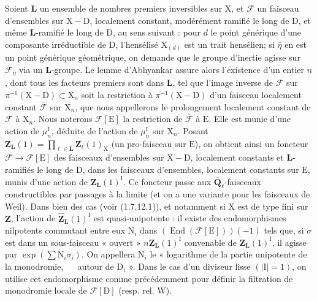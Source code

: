 \documentclass[11pt,leqno]{article}
\newcommand{\Page}[1]{\ifvmode\noindent\else\unskip\ \fi{\footnotesize\textcolor{gray}{[p.\,#1]}}\ \ignorespaces}
\begin{document}
Soient \(\mathbf{L}\) un ensemble de nombres premiers inversibles sur \(\mathrm{X}\), et \(\mathscr{F}\) un faisceau d’ensembles sur \(\mathrm{X}-\mathrm{D}\), localement constant, modérément ramifié le long de \(\mathrm{D}\), et même \(\mathbf{L}\)-ramifié le long de \(\mathrm{D}\), au sens suivant : pour \(d\) le point générique d’une composante irréductible de \(\mathrm{D}\), l’hensélisé \(\mathrm{X}_{(d)}\) est un trait hensélien; si \(\bar{\eta}\) en est un point générique géométrique, on demande que le groupe d’inertie agisse sur \(\mathscr{F}_{\bar{\eta}}\) via un \(\mathbf{L}\)-groupe. Le lemme d’Abhyankar assure alors l’existence d’un entier \(n\), dont tous les facteurs premiers sont dans \(\mathbf{L}\), tel que l’image inverse de \(\mathscr{F}\) sur \(\pi^{-1}(\mathrm{X}-\mathrm{D})\subset\mathrm{X}_n\) soit la restriction à \(\pi^{-1}(\mathrm{X}-\mathrm{D})\) d’un faisceau localement constant \(\overline{\mathscr{F}}\) sur \(\mathrm{X}_n\), que nous appellerons le prolongement localement constant de \(\mathscr{F}\) à \(\mathrm{X}_n\). Nous noterons \(\mathscr{F}[\mathrm{E}]\) la restriction de \(\overline{\mathscr{F}}\) à \(\mathrm{E}\). Elle est munie d’une action de \(\mu_n^{\mathrm{I}}\), déduite de l’action de \(\mu_n^{\mathrm{I}}\) sur \(\mathrm{X}_n\). Posant \(\mathbf{Z}_{\mathbf{L}}(1)=\prod\limits_{\ell\in\mathbf{L}}\mathbf{Z}_\ell(1)_{\mathrm{X}}\) (un pro-faisceau sur \(\mathrm{E}\)), on obtient ainsi un foncteur \(\mathscr{F}\to\mathscr{F}[\mathrm{E}]\) des faisceaux d’ensembles sur \(\mathrm{X}-\mathrm{D}\), localement constants et \(\mathbf{L}\)-ramifiés le long de \(\mathrm{D}\), dans les faisceaux d’ensembles, localement constants sur \(\mathrm{E}\), munis d’une action de \(\mathbf{Z}_{\mathbf{L}}(1)^{\mathrm{I}}\).
Ce foncteur passe aux \(\overline{\mathbf{Q}}_\ell\)-faisceaux constructibles par passages à la limite (et on a une variante pour les faisceaux de Weil). Dans bien des cas (voir (1.7.12.1)), et notamment si \(\mathrm{X}\) est de type fini sur \(\mathbf{Z}\), l’action de \(\widehat{\mathbf{Z}}_{\mathbf{L}}(1)^{\mathrm{I}}\) est quasi-unipotente : il existe des endomorphismes nilpotents commutant entre eux \(\mathrm{N}_i\) dans \((\operatorname{End}(\mathscr{F}[\mathrm{E}]))(-1)\) tels que, si \(\sigma\) est dans un sous-faisceau « ouvert » \(n\mathbf{Z}_{\mathbf{L}}(1)^{\mathrm{I}}\) convenable de \(\mathbf{Z}_{\mathbf{L}}(1)^{\mathrm{I}}\), il agisse par \(\exp(\sum\mathrm{N}_i\sigma_i)\). On appellera \(\mathrm{N}_i\) le « logarithme de la partie unipotente de la monodromie,
\Page{173}
autour de \(\mathrm{D}_i\) ». Dans le cas d’un diviseur lisse \((|\mathrm{I}|=1)\), on utilise cet endomorphisme comme précédemment pour définir la filtration de monodromie locale de \(\mathscr{F}[\mathrm{D}]\) (resp. rel. \(\mathrm{W}\)).
\end{document}
